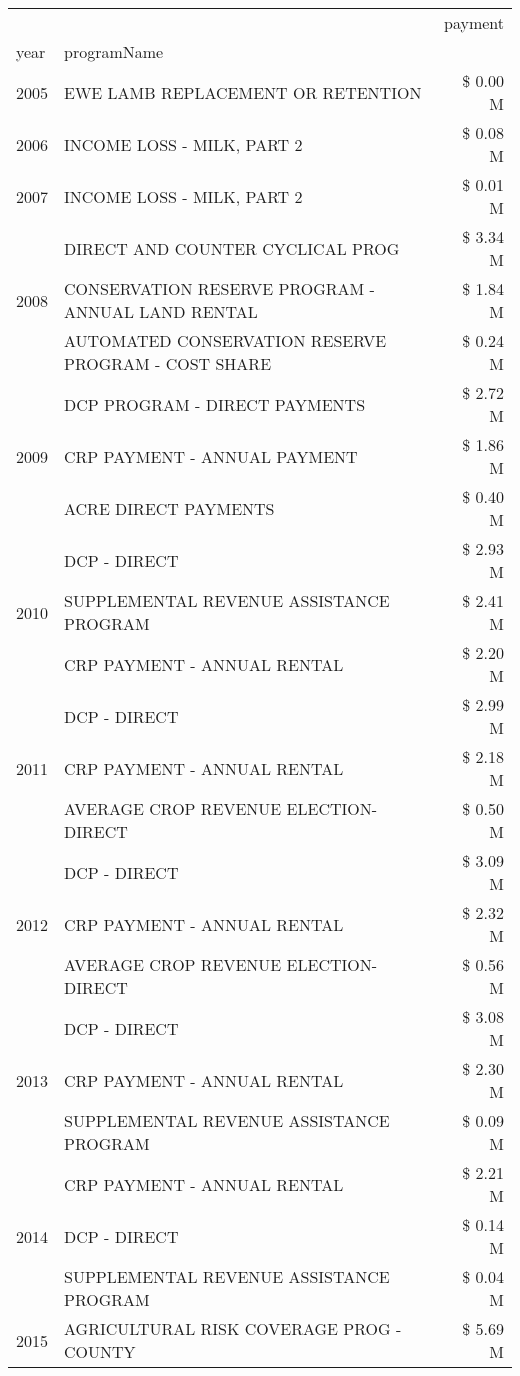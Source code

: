 \begin{tabular}{llr}
\toprule
 &  & payment \\
year & programName &  \\
\midrule
2005 & EWE LAMB REPLACEMENT OR RETENTION & \$ 0.00 M \\
\cline{1-3}
2006 & INCOME LOSS - MILK, PART 2 & \$ 0.08 M \\
\cline{1-3}
2007 & INCOME LOSS - MILK, PART 2 & \$ 0.01 M \\
\cline{1-3}
\multirow[t]{3}{*}{2008} & DIRECT AND COUNTER CYCLICAL PROG & \$ 3.34 M \\
 & CONSERVATION RESERVE PROGRAM - ANNUAL LAND RENTAL & \$ 1.84 M \\
 & AUTOMATED CONSERVATION RESERVE PROGRAM - COST SHARE & \$ 0.24 M \\
\cline{1-3}
\multirow[t]{3}{*}{2009} & DCP PROGRAM - DIRECT PAYMENTS & \$ 2.72 M \\
 & CRP PAYMENT - ANNUAL PAYMENT & \$ 1.86 M \\
 & ACRE DIRECT PAYMENTS & \$ 0.40 M \\
\cline{1-3}
\multirow[t]{3}{*}{2010} & DCP - DIRECT & \$ 2.93 M \\
 & SUPPLEMENTAL REVENUE ASSISTANCE PROGRAM & \$ 2.41 M \\
 & CRP PAYMENT - ANNUAL RENTAL & \$ 2.20 M \\
\cline{1-3}
\multirow[t]{3}{*}{2011} & DCP - DIRECT & \$ 2.99 M \\
 & CRP PAYMENT - ANNUAL RENTAL & \$ 2.18 M \\
 & AVERAGE CROP REVENUE ELECTION-DIRECT & \$ 0.50 M \\
\cline{1-3}
\multirow[t]{3}{*}{2012} & DCP - DIRECT & \$ 3.09 M \\
 & CRP PAYMENT - ANNUAL RENTAL & \$ 2.32 M \\
 & AVERAGE CROP REVENUE ELECTION-DIRECT & \$ 0.56 M \\
\cline{1-3}
\multirow[t]{3}{*}{2013} & DCP - DIRECT & \$ 3.08 M \\
 & CRP PAYMENT - ANNUAL RENTAL & \$ 2.30 M \\
 & SUPPLEMENTAL REVENUE ASSISTANCE PROGRAM & \$ 0.09 M \\
\cline{1-3}
\multirow[t]{3}{*}{2014} & CRP PAYMENT - ANNUAL RENTAL & \$ 2.21 M \\
 & DCP - DIRECT & \$ 0.14 M \\
 & SUPPLEMENTAL REVENUE ASSISTANCE PROGRAM & \$ 0.04 M \\
\cline{1-3}
\multirow[t]{3}{*}{2015} & AGRICULTURAL RISK COVERAGE PROG - COUNTY & \$ 5.69 M \\

\end{tabular}
